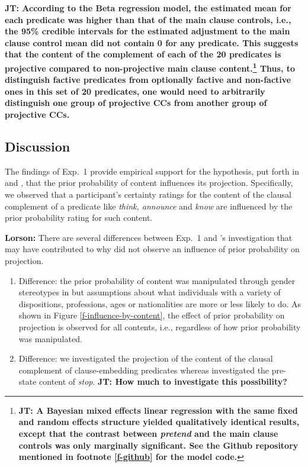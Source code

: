 \documentclass[11pt,fleqn]{article}
\newcommand{\6}{\mbox{$[\hspace*{-.6mm}[$}}
\newcommand{\9}{\mbox{$]\hspace*{-.6mm}]$}}
\newcommand{\citepos}[1]{\citeauthor{#1}'s \citeyear{#1}}
\newcommand{\jt}[1]{\textbf{\color{blue}JT: #1}}
\begin{document}
\jt{According to the Beta regression model, the estimated mean for each predicate was higher than that of the main clause controls, i.e., the 95\% credible intervals for the estimated adjustment to the main clause control mean did not contain 0 for any predicate. This suggests that the content of the complement of each of the 20 predicates is projective compared to non-projective main clause content.\footnote{\jt{A Bayesian mixed effects linear regression with the same fixed and random effects structure yielded qualitatively identical results, except that the contrast between \emph{pretend} and the main clause controls was only marginally significant. See the Github repository mentioned in footnote \ref{f-github} for the model code.}} Thus, to distinguish factive predicates from optionally factive and non-factive ones in this set of 20 predicates, one would need to arbitrarily distinguish one group of projective CCs from another group of projective CCs.} 

\newpage


\subsection{Discussion}

The findings of Exp.~1 provide empirical support for the hypothesis, put forth in \citealt{stevens-etal2017} and \citealt{tbd-variability}, that the prior probability of content influences its projection. Specifically, we observed that a participant's certainty ratings for the content of the clausal complement of a predicate like {\em think, announce} and {\em know} are influenced by the prior probability rating for such content.

{\bf Lorson:} There are several differences between Exp.~1 and \citepos{lorson2018} investigation that may have contributed to why \citealt{lorson2018} did not observe an influence of prior probability on projection. 

\begin{enumerate}

\item Difference: the prior probability of content was manipulated through gender stereotypes in \citealt{lorson2018} but assumptions about what individuals with a variety of dispositions, professions, ages or nationalities are more or less likely to do. As shown in Figure \ref{f-influence-by-content}, the effect of prior probability on projection is observed for all contents, i.e., regardless of how prior probability was manipulated.


\item Difference: we investigated the projection of the content of the clausal complement of clause-embedding predicates whereas \citealt{lorson2018} investigated the pre-state content of {\em stop}. \jt{How much to investigate this possibility?}

\end{enumerate}
\end{document}
